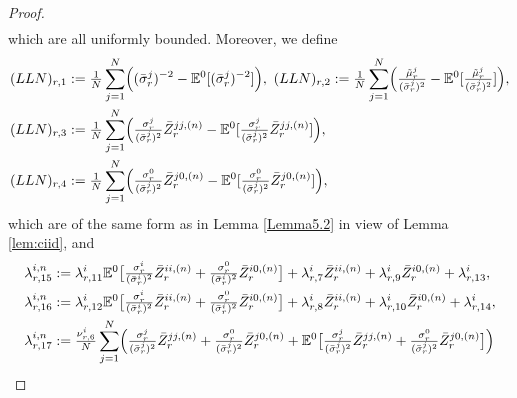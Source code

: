 \documentclass[10pt,a4paper]{article}
\theoremstyle{plain}
\theoremstyle{definition}
\numberwithin{equation}{section}
\begin{document}
\begin{proof}
\begin{align}
\end{align}
which are all uniformly bounded. Moreover, we define
\begin{align}
(LLN)_{r,1} &:= \tfrac{1}{N}\sum_{j=1}^{N}\Bigl((\bar{\sigma}_{r}^{j})^{-2}-\mathbb{E}^{0}[(\bar{\sigma}_{r}^{j})^{-2}]\Bigr), \ (LLN)_{r,2} := \tfrac{1}{N}\sum_{j=1}^{N}\Bigl(\tfrac{\tilde{\mu}_{r}^{j}}{(\bar{\sigma}_{r}^{j})^{2}}-\mathbb{E}^{0}[\tfrac{\tilde{\mu}_{r}^{j}}{(\bar{\sigma}_{r}^{j})^{2}}]\Bigr),  \label{equ:def_LLN1} \\
(LLN)_{r,3} &:= \tfrac{1}{N}\sum_{j=1}^{N}\Bigl(\tfrac{\sigma_{r}^{j}}{(\bar{\sigma}_{r}^{j})^{2}}\bar{Z}_{r}^{jj,(n)}-\mathbb{E}^{0}[\tfrac{\sigma_{r}^{j}}{(\bar{\sigma}_{r}^{j})^{2}}\bar{Z}_{r}^{jj,(n)}]\Bigr), 
\label{equ:def_LLN3} \\
(LLN)_{r,4} &:= \tfrac{1}{N}\sum_{j=1}^{N}\Bigl(\tfrac{\sigma_{r}^{0}}{(\bar{\sigma}_{r}^{j})^{2}}\bar{Z}_{r}^{j0,(n)}-\mathbb{E}^{0}[\tfrac{\sigma_{r}^{0}}{(\bar{\sigma}_{r}^{j})^{2}}\bar{Z}_{r}^{j0,(n)}]\Bigr), \label{equ:def_LLN4}
\end{align}
which are of the same form as in Lemma \ref{Lemma5.2} in view of Lemma \ref{lem:ciid}, and
\begin{align}
\lambda_{r,15}^{i,n} &:= \lambda_{r,11}^{i}\mathbb{E}^{0}\bigl[\tfrac{\sigma_{r}^{i}}{(\bar{\sigma}_{r}^{i})^{2}}\bar{Z}_{r}^{ii,(n)}+\tfrac{\sigma_{r}^{0}}{(\bar{\sigma}_{r}^{i})^{2}}\bar{Z}_{r}^{i0,(n)}\bigr] + \lambda_{r,7}^{i}\bar{Z}_{r}^{ii,(n)} + \lambda_{r,9}^{i}\bar{Z}_{r}^{i0,(n)} + \lambda_{r,13}^{i} \label{equ:def_lambda15}, \\
\lambda_{r,16}^{i,n} &:= \lambda_{r,12}^{i}\mathbb{E}^{0}\bigl[\tfrac{\sigma_{r}^{i}}{(\bar{\sigma}_{r}^{i})^{2}}\bar{Z}_{r}^{ii,(n)}+\tfrac{\sigma_{r}^{0}}{(\bar{\sigma}_{r}^{i})^{2}}\bar{Z}_{r}^{i0,(n)}\bigr] + \lambda_{r,8}^{i}\bar{Z}_{r}^{ii,(n)} + \lambda_{r,10}^{i}\bar{Z}_{r}^{i0,(n)} + \lambda_{r,14}^{i} \label{equ:def_lambda16}, \\
\lambda_{r,17}^{i,n} &:= \tfrac{\nu_{r,6}^{i}}{N}\sum_{j=1}^{N}\Bigl(\tfrac{\sigma_{r}^{j}}{(\bar{\sigma}_{r}^{j})^{2}}\bar{Z}_{r}^{jj,(n)} + \tfrac{\sigma_{r}^{0}}{(\bar{\sigma}_{r}^{j})^{2}}\bar{Z}_{r}^{j0,(n)} + \mathbb{E}^{0}\bigl[\tfrac{\sigma_{r}^{j}}{(\bar{\sigma}_{r}^{j})^{2}}\bar{Z}_{r}^{jj,(n)}+\tfrac{\sigma_{r}^{0}}{(\bar{\sigma}_{r}^{j})^{2}}\bar{Z}_{r}^{j0,(n)}\bigr]\Bigr) \\

\end{align}
\end{proof}
\end{document}
